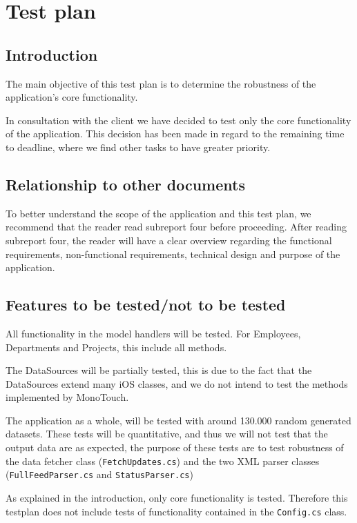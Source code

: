 \section{Test plan}

\subsection{Introduction}
The main objective of this test plan is to determine the robustness
of the application's core functionality.

In consultation with the client we have decided to test only the core
functionality of the application. This decision has been made in
regard to the remaining time to deadline, where we find other
tasks to have greater priority.

\subsection{Relationship to other documents}
To better understand the scope of the application and this test plan,
we recommend that the reader read subreport four before proceeding.
After reading subreport four, the reader will have a clear overview
regarding the functional requirements, non-functional requirements,
technical design and purpose of the application.

\subsection{Features to be tested/not to be tested}
All functionality in the model handlers will be tested. For Employees,
Departments and Projects, this include all methods.

The DataSources will be partially tested, this is due to the fact that
the DataSources extend many iOS classes, and we do not intend to test
the methods implemented by MonoTouch.

The application as a whole, will be tested with around 130.000 random
generated datasets. These tests will be quantitative, and thus we will
not test that the output data are as expected, the purpose of these tests
are to test  robustness of the data fetcher class (\texttt{FetchUpdates.cs})
and the two XML parser classes (\texttt{FullFeedParser.cs} and
\texttt{StatusParser.cs})

As explained in the introduction, only core functionality is
tested. Therefore this testplan does not include tests of
functionality contained in the \texttt{Config.cs} class. 

